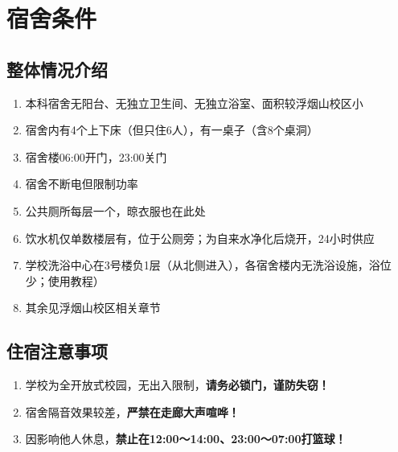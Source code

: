 \section[宿舍条件]{宿舍条件}

\subsection[整体情况介绍]{整体情况介绍}
\begin{enumerate}
    \item 本科宿舍无阳台、无独立卫生间、无独立浴室、面积较浮烟山校区小
    \item 宿舍内有4个上下床（但只住6人），有一桌子（含8个桌洞）
    \item 宿舍楼06:00开门，23:00关门
    \item 宿舍不断电但限制功率\footnotemark
    \item 公共厕所每层一个，晾衣服也在此处
    \item 饮水机仅单数楼层有，位于公厕旁；为自来水净化后烧开，24小时供应
    \item 学校洗浴中心在3号楼负1层（从北侧进入），各宿舍楼内无洗浴设施，浴位少；使用教程）
    \item 其余见浮烟山校区相关章节
\end{enumerate}

\subsection[住宿注意事项]{住宿注意事项}
\begin{enumerate}
    \item 学校为全开放式校园，无出入限制，\textbf{请务必锁门，谨防失窃！}
    \item 宿舍隔音效果较差，\textbf{严禁在走廊大声喧哗！}
    \item 因影响他人休息，\textbf{禁止在12:00～14:00、23:00～07:00打篮球！}
\end{enumerate}